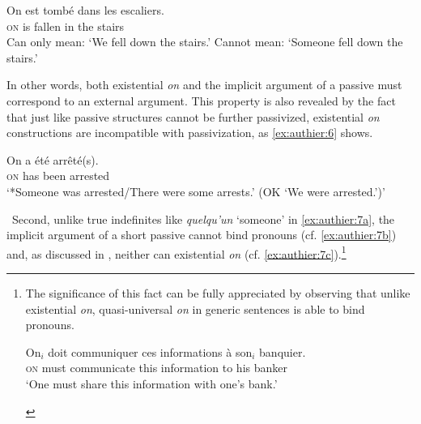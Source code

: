 \documentclass[output=paper,colorlinks,citecolor=brown]{langscibook}
\begin{document}
\begin{exe} %
    \ex \label{ex:authier:5}
            \gll    On est tombé dans les escaliers. \\   %
                    \textsc{on} is   fallen  in    the stairs \\    %
            \glt    Can only mean: `We fell down the stairs.' %
            \glt Cannot mean: `Someone fell down the stairs.'
\end{exe}


In other words, both existential \textit{on} and the implicit argument of a passive must correspond to an external argument. This property is also revealed by the fact that just like passive structures cannot be further passivized, existential \textit{on} constructions are incompatible with passivization, as \ref{ex:authier:6} shows.

\begin{exe} %
    \ex \label{ex:authier:6}
            \gll    On a    été    arrêté(s). \\   %
                    \textsc{on} has been arrested \\    %
            \glt    `*Someone was arrested/There were some arrests.' (OK `We were arrested.')' %
\end{exe}



\ Second, unlike true indefinites like \textit{quelqu’un} ‘someone’ in \ref{ex:authier:7a}, the implicit argument of a short passive cannot bind pronouns (cf. \ref{ex:authier:7b}) and, as discussed in \citet[243]{koenig1999a}, neither can existential \textit{on} (cf. \ref{ex:authier:7c}).\footnote{ 
The significance of this fact can be fully appreciated by observing that unlike existential \textit{on}, quasi-universal \textit{on} in generic sentences is able to bind pronouns.
\begin{exe}
\ex
\gll On$_i$ doit communiquer ces informations à son$_i$ banquier.\\
\textsc{on} must communicate this information to his banker\\
\glt `One must share this information with one’s bank.'
\end{exe}}
\end{document}
